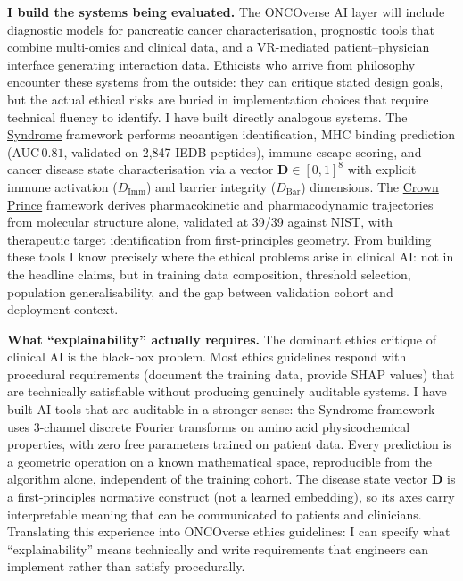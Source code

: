 \documentclass[12pt,a4paper]{article}
\begin{document}
\textbf{I build the systems being evaluated.}
The ONCOverse AI layer will include diagnostic models for pancreatic cancer
characterisation, prognostic tools that combine multi-omics and clinical data,
and a VR-mediated patient--physician interface generating interaction data.
Ethicists who arrive from philosophy encounter these systems from the outside:
they can critique stated design goals, but the actual ethical risks are buried in
implementation choices that require technical fluency to identify.
I have built directly analogous systems.
The \href{https://syndrome-seven.vercel.app/tools}{Syndrome} framework performs
neoantigen identification, MHC binding prediction (AUC\,$0.81$, validated on 2,847
IEDB peptides), immune escape scoring, and cancer disease state characterisation
via a vector $\mathbf{D}\in[0,1]^8$ with explicit immune activation ($D_\mathrm{Imm}$)
and barrier integrity ($D_\mathrm{Bar}$) dimensions.
The \href{https://github.com/fullscreen-triangle/crown-prince}{Crown Prince} framework
derives pharmacokinetic and pharmacodynamic trajectories from molecular structure alone,
validated at 39/39 against NIST, with therapeutic target identification from
first-principles geometry.
From building these tools I know precisely where the ethical problems arise in
clinical AI: not in the headline claims, but in training data composition,
threshold selection, population generalisability, and the gap between validation
cohort and deployment context.

\textbf{What ``explainability'' actually requires.}
The dominant ethics critique of clinical AI is the black-box problem.
Most ethics guidelines respond with procedural requirements (document the training
data, provide SHAP values) that are technically satisfiable without producing
genuinely auditable systems.
I have built AI tools that are auditable in a stronger sense: the Syndrome
framework uses 3-channel discrete Fourier transforms on amino acid physicochemical
properties, with zero free parameters trained on patient data.
Every prediction is a geometric operation on a known mathematical space,
reproducible from the algorithm alone, independent of the training cohort.
The disease state vector $\mathbf{D}$ is a first-principles normative construct
(not a learned embedding), so its axes carry interpretable meaning that can be
communicated to patients and clinicians.
Translating this experience into ONCOverse ethics guidelines: I can specify what
``explainability'' means technically and write requirements that engineers can
implement rather than satisfy procedurally.
\end{document}

